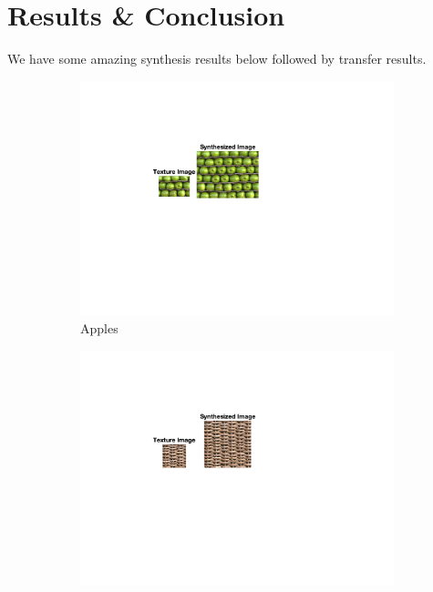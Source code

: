 \documentclass[10pt,twocolumn,letterpaper]{article}
\begin{document}
\section{Results \& Conclusion}
We have some amazing synthesis results below followed by transfer results.

\begin{figure}
     \centering
     \begin{subfigure}[h]{0.33\textwidth}
         \centering
         \includegraphics[trim={4.5cm 7cm 8.0cm 3cm}, clip, scale=1.5, width=\textwidth]{../results/syn_final/result_apples_c_B_40.png}
         \caption{Apples}
         \label{fig:apples_res}
     \end{subfigure}
     \hfill
     \begin{subfigure}[h]{0.33\textwidth}
        \centering
        \includegraphics[trim={4.5cm 7cm 8.0cm 3cm}, clip, scale=1.5, width=\textwidth]{../results/syn_final/result_jute_c_B_40.png}

\end{subfigure}
\end{figure}
\end{document}
